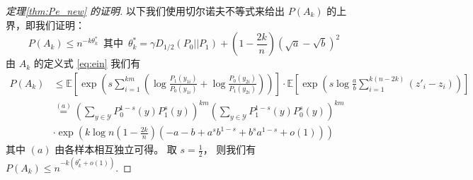 \begin{proof}[定理\ref{thm:Pe_new} 的证明]

以下我们使用切尔诺夫不等式来给出 $P(A_k)$
的上界，即我们证明：
$$
P(A_k) \leq n^{-k\theta^*_k} 
\,\textrm{ 其中 }\, \theta^*_k=\gamma D_{1/2}(P_0||P_1)
+\left(1-\frac{2k}{n} \right)\left(\sqrt{a}-\sqrt{b}
\right)^2
$$
由 $A_k$ 的定义式 \eqref{eq:ein} 我们有
\begin{align*}
P(A_k) &\leq \mathbb{E}
\left[\exp \left( s\sum_{i=1}^{km}
\left( \log \frac{P_1(y_{1i})}
    {P_0(y_{1i})}
+ \log \frac{P_0(y_{2i})}
    {P_1(y_{2i})} \right)
\right)\right]\cdot \mathbb{E}
\left[\exp\left(s\log \frac{a}{b}\sum_{i=1}^{k(n-2k)} (z'_i - z_i )\right)
\right] \\
& \stackrel{(a)}{=}
\left(\sum_{y\in \mathcal{Y}}
P_0^{1-s}(y)P_1^{s}(y)\right)^{km}
\left(\sum_{y\in \mathcal{Y}} P_1^{1-s}(y) P_0^{s}(y)
\right)^{km}\\
&   \cdot \exp\left(
    k\log n \left(1-\frac{2k}{n} \right)
    (-a-b+a^sb^{1-s}+b^sa^{1-s} +o(1)) 
    \right)
\end{align*}
其中 $(a)$ 由各样本相互独立可得。 取 $s=\frac{1}{2}$，
则我们有
$P(A_k) \leq  n^{-k(\theta^*_k+o(1))}$.


\end{proof}
